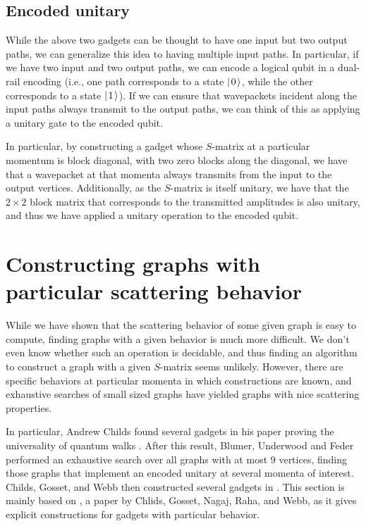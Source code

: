 \documentclass[../thesis-main/thesis-main]{subfiles}
\begin{document}

\subsection{Encoded unitary}

While the above two gadgets can be thought to have one input but two output paths, we can generalize this idea to having multiple input paths.  In particular, if we have two input and two output paths, we can encode a logical qubit in a dual-rail encoding (i.e., one path corresponds to a state $|\mspace{2mu} 0 \mspace{2mu} \rangle$, while the other corresponds to a state $|\mspace{2mu} 1 \mspace{2mu} \rangle$).  If we can ensure that wavepackets incident along the input paths always transmit to the output paths, we can think of this as applying a unitary gate to the encoded qubit.

In particular, by constructing a gadget whose $S$-matrix at a particular momentum is block diagonal, with two zero blocks along the diagonal, we have that a wavepacket at that momenta always transmits from the input to the output vertices.  Additionally, as the $S$-matrix is itself unitary, we have that the $2\times2$ block matrix that corresponds to the transmitted amplitudes is also unitary, and thus we have applied a unitary operation to the encoded qubit.  



\section{Constructing graphs with particular scattering behavior}

While we have shown that the scattering behavior of some given graph is easy to compute, finding graphs with a given behavior is much more difficult.  We don't even know whether such an operation is decidable, and thus finding an algorithm to construct a graph with a given $S$-matrix seems unlikely.  However, there are specific behaviors at particular momenta in which constructions are known, and exhaustive searches of small sized graphs have yielded graphs with nice scattering properties.  

In particular, Andrew Childs found several gadgets in his paper proving the universality of quantum walks \cite{Chi09}.  After this result, Blumer, Underwood and Feder \cite{BUF11} performed an exhaustive search over all graphs with at most 9 vertices, finding those graphs that implement an encoded unitary at several momenta of interest.  Childs, Gosset, and Webb then constructed several gadgets in \cite{MPQW}.  This section is mainly based on \cite{MomSwitches}, a paper by Chlids, Gosset, Nagaj, Raha, and Webb, as it gives explicit constructions for gadgets with particular behavior.
\end{document}

